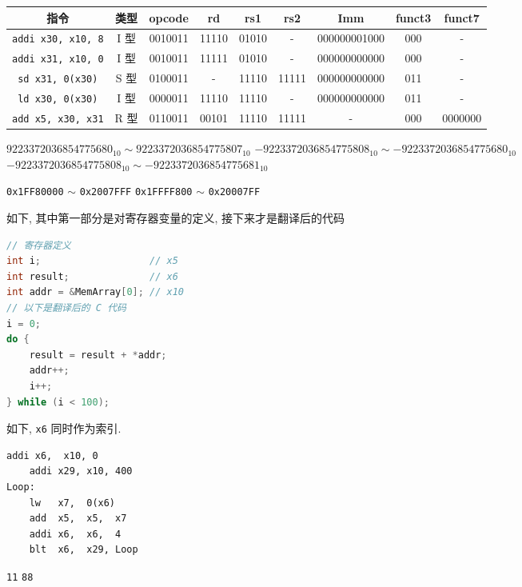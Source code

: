 \documentclass[11pt]{homework}
\begin{document}
\maketitle
\question
\begin{center}
    \begin{tabular}{ccccccccc}
        \toprule
        指令                        & 类型 & opcode  & rd    & rs1   & rs2   & Imm          & funct3 & funct7 \\
        \midrule
        \texttt{addi x30, x10, 8}   & I 型 & 0010011 & 11110 & 01010 & -     & 000000001000 & 000    & -       \\
        \texttt{addi x31, x10, 0}   & I 型 & 0010011 & 11111 & 01010 & -     & 000000000000 & 000    & -       \\
        \texttt{sd   x31, 0(x30)}   & S 型 & 0100011 & -     & 11110 & 11111 & 000000000000 & 011    & -       \\
        \texttt{ld   x30, 0(x30)}   & I 型 & 0000011 & 11110 & 11110 & -     & 000000000000 & 011    & -       \\
        \texttt{add  x5,  x30, x31} & R 型 & 0110011 & 00101 & 11110 & 11111 & -            & 000    & 0000000 \\
        \bottomrule
    \end{tabular}
\end{center}
\question
\begin{arabicparts}
    \questionpart $9223372036854775680_{10}\sim 9223372036854775807_{10}$
    \questionpart $-9223372036854775808_{10}\sim -9223372036854775680_{10}$
    \questionpart $-9223372036854775808_{10}\sim -9223372036854775681_{10}$
\end{arabicparts}
\question
\begin{arabicparts}
    \questionpart \texttt{0x1FF80000} $\sim$ \texttt{0x2007FFF}
    \questionpart \texttt{0x1FFFF800} $\sim$ \texttt{0x20007FF}
\end{arabicparts}
\question
\begin{arabicparts}
    \questionpart 如下, 其中第一部分是对寄存器变量的定义, 接下来才是翻译后的代码
    \begin{lstlisting}[language=C]
// 寄存器定义
int i;                   // x5
int result;              // x6
int addr = &MemArray[0]; // x10
// 以下是翻译后的 C 代码
i = 0;
do {
    result = result + *addr;
    addr++;
    i++;
} while (i < 100);
    \end{lstlisting}
    \questionpart 如下, \texttt{x6} 同时作为索引.
    \begin{lstlisting}[language={[RISC-V]Assembler}]
    addi x6,  x10, 0
    addi x29, x10, 400
Loop:
    lw   x7,  0(x6)
    add  x5,  x5,  x7
    addi x6,  x6,  4
    blt  x6,  x29, Loop
    \end{lstlisting}
\end{arabicparts}
\question
\begin{arabicparts}
    \questionpart \texttt{11}
    \questionpart \texttt{88}
\end{arabicparts}
\end{document}
